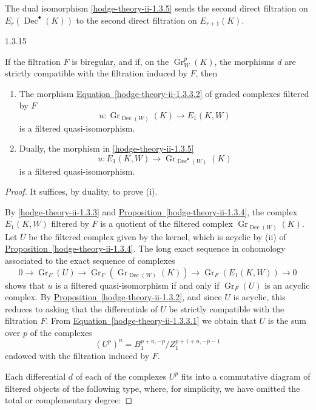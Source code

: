     The dual isomorphism \cref{hodge-theory-ii-1.3.5} sends the second direct filtration on \(E_r(\operatorname {Dec}^\bullet (K))\) to the second direct filtration on \(E_{r+1}(K)\).\begin{lemma}{1.3.15}\label{hodge-theory-ii-1.3.15}\skipsinglepar\par{}If the filtration \(F\) is biregular, and if, on the \(\operatorname {Gr}_W^p(K)\), the morphisms \(d\) are strictly compatible with the filtration induced by \(F\), then

    
 \begin{enumerate}
      
 \item[(i)]
        The morphism \hyperref[hodge-theory-ii-1.3.3.2]{Equation~\ref*{hodge-theory-ii-1.3.3.2}} of graded complexes filtered by \(F\)
        \[           u\colon  \operatorname {Gr}_{\operatorname {Dec}(W)}(K)           \to  E_1(K,W)         \]
        is a filtered quasi-isomorphism.
      


      
 \item[(ii)]
        Dually, the morphism in \cref{hodge-theory-ii-1.3.5}
        \[           u\colon  E_1(K,W)           \to  \operatorname {Gr}_{\operatorname {Dec}^\bullet (W)}(K)         \]
        is a filtered quasi-isomorphism.
      

    \end{enumerate}\begin{proof}\par{}It suffices, by duality, to prove (i).\par{}By \cref{hodge-theory-ii-1.3.3} and \hyperref[hodge-theory-ii-1.3.4]{Proposition~\ref*{hodge-theory-ii-1.3.4}}, the complex \(E_1(K,W)\) filtered by \(F\) is a quotient of the filtered complex \(\operatorname {Gr}_{\operatorname {Dec}(W)}(K)\).
      Let \(U\) be the filtered complex given by the kernel, which is acyclic by (ii) of \hyperref[hodge-theory-ii-1.3.4]{Proposition~\ref*{hodge-theory-ii-1.3.4}}.
      The long exact sequence in cohomology associated to the exact sequence of complexes
      \[         0         \to  \operatorname {Gr}_F(U)         \to  \operatorname {Gr}_F(\operatorname {Gr}_{\operatorname {Dec}(W)}(K))         \to  \operatorname {Gr}_F(E_1(K,W))         \to  0       \]
      shows that \(u\) is a filtered quasi-isomorphism if and only if \(\operatorname {Gr}_F(U)\) is an acyclic complex.
      By \hyperref[hodge-theory-ii-1.3.2]{Proposition~\ref*{hodge-theory-ii-1.3.2}}, and since \(U\) is acyclic, this reduces to asking that the differentials of \(U\) be strictly compatible with the filtration \(F\).
      From \hyperref[hodge-theory-ii-1.3.3.1]{Equation~\ref*{hodge-theory-ii-1.3.3.1}} we obtain that \(U\) is the sum over \(p\) of the complexes
      \[         (U^p)^n         = B_1^{p+n,-p}/Z_1^{p+1+n,-p-1}       \]
      endowed with the filtration induced by \(F\).\par{}Each differential \(d\) of each of the complexes \(U^p\) fits into a commutative diagram of filtered objects of the following type, where, for simplicity, we have omitted the total or complementary degree:


\end{proof}
\end{lemma}
